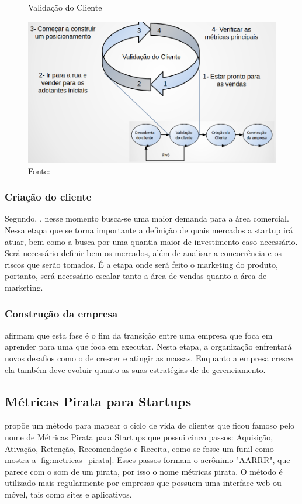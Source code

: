 \begin{figure}[H]
\caption{Validação do Cliente}
\centerline{\includegraphics[scale=0.3]{img/validacao_do_cliente}}
\label{fig:validacao_do_cliente}
\caption* {Fonte: }
\end{figure}

\subsubsection{Criação do cliente}
\label{cha:criacao_do_cliente}
Segundo, , nesse momento busca-se uma maior demanda para a área comercial. Nessa etapa que se torna importante a definição de quais mercados a startup irá atuar, bem como a busca por uma quantia maior de investimento caso necessário. Será necessário definir bem os mercados, além de analisar a concorrência e os riscos que serão tomados. É a etapa onde será feito o marketing do produto, portanto, será necessário escalar tanto a área de vendas quanto a área de marketing.

\subsubsection{Construção da empresa}
\label{cha:construcao_da_empresa}
 afirmam que esta fase é o fim da transição entre uma empresa que foca em aprender para uma que foca em executar. Nesta etapa, a organização enfrentará novos desafios como o de crescer e atingir as massas. Enquanto a empresa cresce ela também deve evoluir quanto as suas estratégias de de gerenciamento.

\subsection{Métricas Pirata para Startups}
\label{cha:metricas_pirata}
 propõe um método para mapear o ciclo de vida de clientes que ficou famoso pelo nome de Métricas Pirata para Startups que possui cinco passos: Aquisição, Ativação, Retenção, Recomendação e Receita, como se fosse um funil como mostra a \autoref{fig:metricas_pirata}. Esses passos formam o acrônimo "AARRR", que parece com o som de um pirata, por isso o nome métricas pirata.
O método é utilizado mais regularmente por empresas que possuem uma interface web ou móvel, tais como sites e aplicativos.

